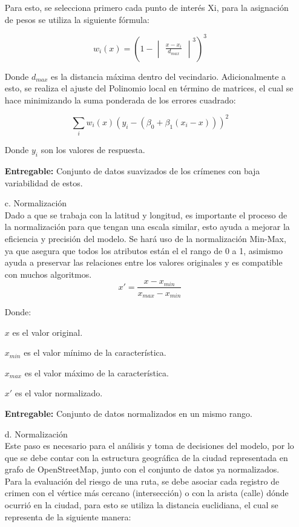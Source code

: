 \begin{itemize}
Para esto, se selecciona primero cada punto de interés Xi, para la asignación de pesos se utiliza la siguiente fórmula:

\begin{equation} 
	w_{i}(x)=(1-\begin{vmatrix}
		\frac{x-x_{i}}{d_{max}}
	\end{vmatrix}^{3})^{3}
\end{equation}

Donde $d_{max}$ es la distancia máxima dentro del vecindario.
Adicionalmente a esto, se realiza el ajuste del Polinomio local en término de matrices, el cual se hace minimizando la suma ponderada de los errores cuadrado:

\begin{equation} 
	\sum_{i}w_{i}(x)(y_{i}-(\beta _{0}+\beta _{1}(x_{i}-x)))^{2}
\end{equation}

Donde $y_{i}$ son los valores de respuesta.

\textbf{Entregable:} Conjunto de datos suavizados de los crímenes con baja variabilidad de estos.

	\item[c.] Normalización \\

Dado a que se trabaja con la latitud y longitud, es importante el proceso de la normalización para que tengan una escala similar, esto ayuda a mejorar la eficiencia y precisión del modelo. Se hará uso de la normalización Min-Max, ya que asegura que todos los atributos están el el rango de 0 a 1, asimismo ayuda a preservar las relaciones entre los valores originales y es compatible con muchos algoritmos\parencite{gl_med}. 
	\begin{equation} 
		{x}'=\frac{x-x_{min}}{x_{max}-x_{min}}
	\end{equation}

Donde:

$x$ es el valor original.

$x_{min}$ es el valor mínimo de la característica.

$x_{max}$ es el valor máximo de la característica.

${x}'$ es el valor normalizado.

\textbf{Entregable:} Conjunto de datos normalizados en un mismo rango.
	
	\item[d.] Normalización \\
	
Este paso es necesario para el análisis y toma de decisiones del modelo, por lo que se debe contar con la estructura geográfica de la ciudad representada en grafo de OpenStreetMap, junto con el conjunto de datos ya normalizados. Para la evaluación del riesgo de una ruta, se debe asociar cada registro de crimen con el vértice más cercano (intersección) o con la arista (calle) dónde ocurrió en la ciudad, para esto se utiliza la distancia euclidiana, el cual se representa de la siguiente manera:


\end{itemize}
